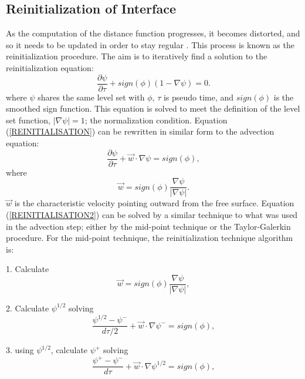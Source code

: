 \subsection{Reinitialization of Interface}

As the computation of the distance function progresses, it becomes distorted, and so it needs to be updated in order to stay regular \cite{SUSSMAN1994}. This process is known as the reinitialization procedure. The aim is to iteratively find a solution to the reinitialization equation:
%
\begin{equation}
\frac{\partial \psi}{\partial \tau} + sign(\phi)(1 - \nabla \psi) = 0.
\label{REINITIALISATION}
\end{equation}
%
where $\psi$ shares the same level set with $\phi$, $\tau$ is pseudo time, and $sign(\phi)$ is the smoothed sign function. This equation is solved to meet the definition of the level set function, $\lvert \nabla \psi \rvert = 1$; the normalization condition. Equation (\ref{REINITIALISATION}) can be rewritten in similar form to the advection equation:
%
\begin{equation}
\frac{\partial \psi}{\partial \tau} + \vec{w} \cdot \nabla \psi = sign(\phi),
\label{REINITIALISATION2}
\end{equation}
%
where
%
\begin{equation}
\vec{w} = sign(\phi)\frac{\nabla \psi}{|\nabla \psi|}.
\label{REINITIALISATION3}
\end{equation}
%
$\vec{w}$ is the characteristic velocity pointing outward from the free surface. Equation (\ref{REINITIALISATION2}) can be solved by a similar technique to what was used in the advection step; either by the mid-point technique \cite{BOURGOUIN2006} or the Taylor-Galerkin procedure. For the mid-point technique, the reinitialization technique algorithm is:

1. Calculate
%
\begin{equation}
\vec{w} = sign(\phi)\frac{\nabla \psi}{|\nabla \psi|},
\label{REINITIAL MIDPOINT1}
\end{equation}
%

2. Calculate $\psi^{1/2}$ solving
%
\begin{equation}
\frac{\psi^{1/2} - \psi^{-}}{d\tau/2} + \vec{w} \cdot \nabla \psi^{-}= sign(\phi),
\label{REINITIAL MIDPOINT2}
\end{equation}
%

3. using $\psi^{1/2}$, calculate $\psi^{+}$ solving
%
\begin{equation}
\frac{\psi^{+} - \psi^{-}}{d\tau} + \vec{w} \cdot \nabla \psi^{1/2}= sign(\phi),
\label{REINITIAL MIDPOINT3}
\end{equation}
%

